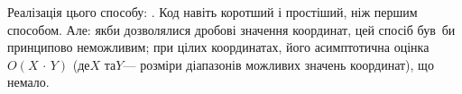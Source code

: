 Реалізація цього способу: .
Код навіть коротший і простіший, ніж першим способом. Але: якби дозволялися дробові значення координат, цей спосіб був~би принципово неможливим; при цілих координатах, його асимптотична оцінка ${O(X\,{\cdot}\,Y)}$ (де\nolinebreak[2] $X$ та\nolinebreak[3] $Y$\nolinebreak[3] --- розміри діапазонів можливих значень координат), що немало.
